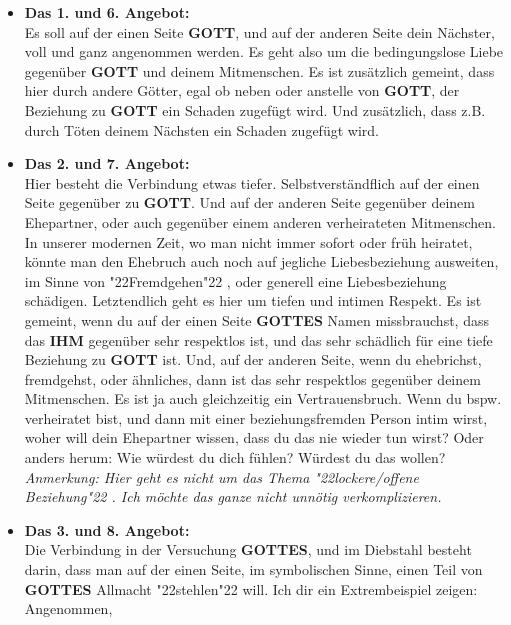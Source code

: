 \documentclass[12pt,a4paper]{article}
\newcommand{\Gottes}[0]{\textbf{GOTTES}}
\newcommand{\Gott}[0]{\textbf{GOTT}}
\newcommand{\Ihm}[0]{\textbf{IHM}}
\newcommand{\q}[1]{\char"22{#1}\char"22 }
\begin{document}
		\begin{itemize}
			\item	\textbf{Das 1. und 6. Angebot:}
			\\		Es soll auf der einen Seite {\Gott},
					und auf der anderen Seite dein N\"achster,
					voll und ganz angenommen werden.
					Es geht also um die bedingungslose Liebe gegen\"uber {\Gott} und deinem Mitmenschen.
					Es ist zus\"atzlich gemeint,
					dass hier durch andere G\"otter,
					egal ob neben oder anstelle von {\Gott},
					der Beziehung zu {\Gott} ein Schaden zugef\"ugt wird.
					Und zus\"atzlich,
					dass z.B. durch T\"oten deinem N\"achsten ein Schaden zugef\"ugt wird.
			\item	\textbf{Das 2. und 7. Angebot:}
			\\		Hier besteht die Verbindung etwas tiefer.
					Selbstverst\"andflich auf der einen Seite gegen\"uber zu {\Gott}.
					Und auf der anderen Seite gegen\"uber deinem Ehepartner,
					oder auch gegen\"uber einem anderen verheirateten Mitmenschen.
					In unserer modernen Zeit,
					wo man nicht immer sofort oder fr\"uh heiratet,
					k\"onnte man den Ehebruch auch noch auf jegliche Liebesbeziehung ausweiten,
					im Sinne von \q{Fremdgehen},
					oder generell eine Liebesbeziehung sch\"adigen.
					Letztendlich geht es hier um tiefen und intimen Respekt.
					Es ist gemeint,
					wenn du auf der einen Seite {\Gottes} Namen missbrauchst,
					dass das {\Ihm} gegen\"uber sehr respektlos ist,
					und das sehr sch\"adlich f\"ur eine tiefe Beziehung zu {\Gott} ist.
					Und,
					auf der anderen Seite,
					wenn du ehebrichst,
					fremdgehst,
					oder \"ahnliches,
					dann ist das sehr respektlos gegen\"uber deinem Mitmenschen.
					Es ist ja auch gleichzeitig ein Vertrauensbruch.
					Wenn du bspw. verheiratet bist,
					und dann mit einer beziehungsfremden Person intim wirst,
					woher will dein Ehepartner wissen,
					dass du das nie wieder tun wirst?
					Oder anders herum:
					Wie w\"urdest du dich f\"uhlen?
					W\"urdest du das wollen?
					\textit{Anmerkung:
					Hier geht es nicht um das Thema \q{lockere/offene Beziehung}.
					Ich m\"ochte das ganze nicht unn\"otig verkomplizieren.}
			\item	\textbf{Das 3. und 8. Angebot:}
			\\		Die Verbindung in der Versuchung {\Gottes},
					und im Diebstahl besteht darin,
					dass man auf der einen Seite,
					im symbolischen Sinne,
					einen Teil von {\Gottes} Allmacht \q{stehlen} will.
					Ich dir ein Extrembeispiel zeigen:
					Angenommen,

\end{itemize}
\end{document}
